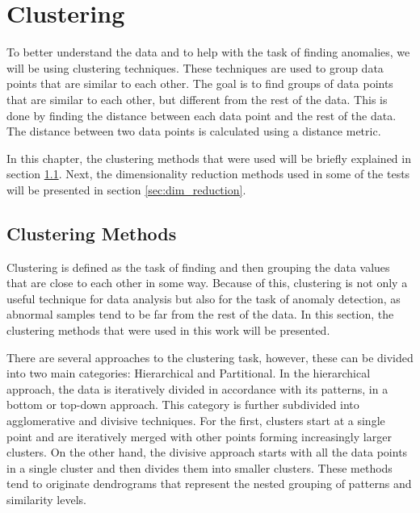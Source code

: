 \chapter{Clustering}\label{chap:clustering}

To better understand the data and to help with the task of finding anomalies, we will be using clustering techniques. These techniques are used to group data points that are similar to each other. The goal is to find groups of data points that are similar to each other, but different from the rest of the data. This is done by finding the distance between each data point and the rest of the data. The distance between two data points is calculated using a distance metric.

In this chapter, the clustering methods that were used will be briefly explained in section \ref{sec:clustering_methods}. Next, the dimensionality reduction methods used in some of the tests will be presented in section \ref{sec:dim_reduction}. 

\section{Clustering Methods}\label{sec:clustering_methods}
Clustering is defined as the task of finding and then grouping the data values that are close to each other in some way. Because of this, clustering is not only a useful technique for data analysis but also for the task of anomaly detection, as abnormal samples tend to be far from the rest of the data. In this section, the clustering methods that were used in this work will be presented.

There are several approaches to the clustering task, however, these can be divided into two main categories: Hierarchical and Partitional. In the hierarchical approach, the data is iteratively divided in accordance with its patterns, in a bottom or top-down approach. This category is further subdivided into agglomerative and divisive techniques. For the first, clusters start at a single point and are iteratively merged with other points forming increasingly larger clusters. On the other hand, the divisive approach starts with all the data points in a single cluster and then divides them into smaller clusters. These methods tend to originate dendrograms that represent the nested grouping of patterns and similarity levels. \cite{Jain.Murty.ea_Dataclusteringreview_1999a, Saxena.Prasad.ea_reviewclusteringtechniques_2017}

